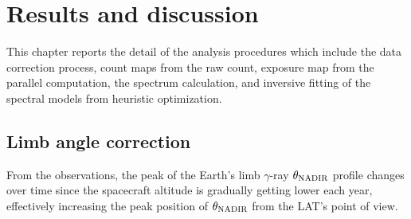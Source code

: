 \chapter{Results and discussion}

This chapter reports the detail of the analysis procedures which include
the data correction process, count maps from the raw count,  
exposure map from the parallel computation, the spectrum calculation,
and inversive fitting of the spectral models from heuristic optimization.

\section{Limb angle correction}
From the observations, the
peak of the Earth's limb $\gamma$-ray $\theta_{\rm NADIR}$ profile changes over time
since the spacecraft altitude is gradually getting lower each
year, effectively increasing the peak position of $\theta_{\rm NADIR}$
from the LAT's point of view.

